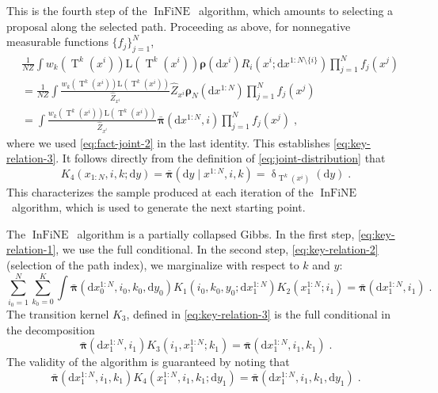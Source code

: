 \documentclass{article}
\def\IFIS{\ensuremath{\operatorname{InFiNE}}}
\def\transfo{\operatorname{T}}
\def\rmd{\operatorname{d}\hspace{-2pt}}
\newcommand{\chunk}[3]{#1_{#2:#3}}
\def\rmd{\mathrm{d}}
\def\eqsp{\,}
\def\eqsp{\;}
\newcommand{\1}{\mathds{1}}
\def\w{w}
\newcommand{\chunku}[3]{#1^{#2:#3}}
\newcommand{\chunkum}[4]{#1^{#2:#3 \setminus \{#4\}}}
\def\const{Z}
\newcommand{\estConstC}[1]{\widehat{Z}_{#1}}
\def\measpi{\boldsymbol{\pi}}
\def\measprop{\boldsymbol{\rho}}
\def\rmd{\mathrm{d}}
\def\likelihood{\mathrm{L}}
\def\bmeaspi{\bar{\measpi}}
\begin{document}
This is the fourth step of the \IFIS\ algorithm, which amounts to selecting a proposal along the selected path.
Proceeding as above, for nonnegative measurable functions $\{f_j\}_{j=1}^N$,
\begin{align*}
& \frac{1}{N \const} \int \w_k(\transfo^k(x^i)) \likelihood(\transfo^k(x^i))
\measprop(\rmd x^i) R_i(x^i; \rmd \chunkum{x}{1}{N}{i}) \prod_{j=1}^N f_j(x^j) \\
&= \frac{1}{N \const} \int \frac{\w_k(\transfo^k(x^i)) \likelihood(\transfo^k(x^i))}{\estConstC{x^i}}
\estConstC{x^i} \measprop_N(\rmd \chunku{x}{1}{N})  \prod_{j=1}^N f_j(x^j) \\
&= \int \frac{\w_k(\transfo^k(x^i)) \likelihood(\transfo^k(x^i))}{\estConstC{x^i}}
\bmeaspi(\rmd \chunku{x}{1}{N},i) \prod_{j=1}^N f_j(x^j)\eqsp,
\end{align*}
where we used \eqref{eq:fact-joint-2} in the last identity. This establishes \eqref{eq:key-relation-3}.
It follows directly from the definition of \eqref{eq:joint-distribution} that
\begin{equation}
\label{eq:key-relation-4}
K_4(\chunk{x}{1}{N},i,k;\rmd y)= \bmeaspi(\rmd y \mid \chunku{x}{1}{N},i,k)= \updelta_{\transfo^k(x^i)}(\rmd y) \eqsp.
\end{equation}
This characterizes the sample produced at each iteration of the \IFIS\ algorithm, which is used to generate the next starting point.

The \IFIS\ algorithm is a partially collapsed Gibbs. In the first step, \eqref{eq:key-relation-1}, we use the full conditional. In the second step, \eqref{eq:key-relation-2} (selection of the path index), we marginalize with respect to $k$ and $y$:
\[
\sum_{i_0=1}^N \sum_{k_0=0}^K \int \bmeaspi(\rmd \chunku{x_0}{1}{N},i_0,k_0,\rmd y_0)
K_1(i_0,k_0,y_0;\rmd \chunku{x_1}{1}{N}) K_2(\chunku{x_1}{1}{N};i_1)= \bmeaspi(\rmd \chunku{x_1}{1}{N},i_1) \eqsp.
\]
The transition kernel $K_3$, defined in \eqref{eq:key-relation-3} is the full conditional in the decomposition
\[
\bmeaspi(\rmd \chunku{x_1}{1}{N},i_1) K_3(i_1,\chunku{x_1}{1}{N};k_1)= \bmeaspi(\rmd \chunku{x_1}{1}{N},i_1,k_1) \eqsp.
\]
The validity of the algorithm is guaranteed by noting that
\[
\bmeaspi(\rmd \chunku{x_1}{1}{N},i_1,k_1) K_4(\chunku{x_1}{1}{N},i_1,k_1; \rmd y_1)=
\bmeaspi(\rmd \chunku{x_1}{1}{N},i_1,k_1, \rmd y_1) \eqsp.
\]
\end{document}
